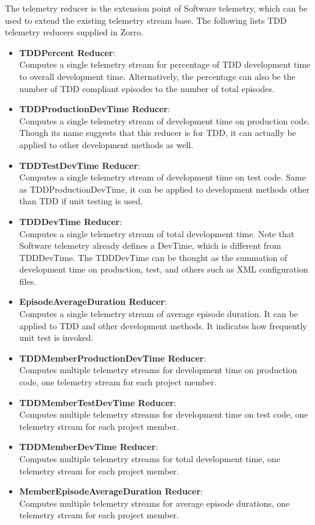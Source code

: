 The telemetry reducer is the extension point of Software telemetry, 
which can be used to extend the existing telemetry stream base.  
The following lists TDD telemetry reducers supplied in Zorro.
\begin{itemize}
\item \textbf{TDDPercent Reducer}:\\
Computes a single telemetry stream for percentage of TDD development 
time to overall development time. Alternatively, the percentage 
can also be the number of TDD compliant episodes to the number of 
total episodes. 

\item \textbf{TDDProductionDevTime Reducer}:  \\
Computes a single telemetry stream of development time on 
production code. Though its name suggests that this reducer 
is for TDD, it can actually be applied to other development 
methods as well.

\item \textbf{TDDTestDevTime Reducer}: \\
Computes a single telemetry stream of development time on
test code. Same as TDDProductionDevTime, it can be applied 
to development methods other than TDD if unit testing is 
used. 

\item \textbf{TDDDevTime Reducer}: \\
Computes a single telemetry stream of total development time. 
Note that Software telemetry already defines a DevTime, which
is different from TDDDevTime. The TDDDevTime can be 
thought as the summation of development time on production,
test, and others such as XML configuration files. 

\item \textbf{EpisodeAverageDuration Reducer}: \\
Computes a single telemetry stream of average episode duration.
It can be applied to TDD and other development methods. It 
indicates how frequently unit test is invoked. 

\item \textbf{TDDMemberProductionDevTime Reducer}: \\
Computes multiple telemetry streams for development time on
production code, one telemetry stream for each project member.

\item \textbf{TDDMemberTestDevTime Reducer}: \\
Computes multiple telemetry streams for development time on
test code, one telemetry stream for each project member.

\item \textbf{TDDMemberDevTime Reducer}: \\
Computes multiple telemetry streams for total development time, 
one telemetry stream for each project member.

\item \textbf{MemberEpisodeAverageDuration Reducer}: \\
Computes multiple telemetry streams for average episode durations, 
one telemetry stream for each project member.

\end{itemize}

